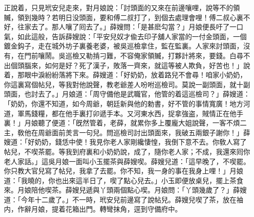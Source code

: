 正說着，只見玳安兒走來，對月娘說：「討頭面的又來在前邊嚷哩，說等不的領贓，領到幾時？若明日没頭面，要和傅二叔打了，到個去處理會哩！傅二叔心裏不好，往家去了。那人嚷了囘去了。」薛嫂問：「是甚麽勾當？」月娘便長吁了一口氣，如此這般，告訴薛嫂說：「平安兒奴才偸去印子舖人家當的一付金頭面，一個鍍金鈎子，走在城外坊子裏養老婆，被吳巡檢拿住，監在監裏。人家來討頭面，沒有，在門前嚷鬧。吳巡檢又勒掯刁難，不容俺家領贓，打夥計將來，要錢。白尋不出個頭腦來，如何是好？死了漢子，敗落一齊來，就這等被人欺負，好苦也！」說着，那眼中淚紛紛落將下來。薛嫂道：「好奶奶，放着路兒不會尋！咱家小奶奶，你這裏寫個帖兒，等我對他說聲，教老爺差人吩咐巡檢司。莫說一副頭面，就十副頭面，也討去了。」月娘道：「周守備他是武職官，他管的着這巡檢司？」薛嫂道：「奶奶，你還不知道，如今周爺，朝廷新與他的勅書，好不管的事情寬廣！地方河道，軍馬錢糧，都在他手裏打卯遞手本。又河東水西，捉拿強盗，賊情正在他手裏！」月娘聽了便道：「旣然管着，老薛，就累你多上覆龐大姐說聲，一客不煩二主，敎他在周爺面前羙言一句兒。問巡檢司討出頭面來，我破五兩銀子謝你！」薛嫂道：「好奶奶，錢恁中使！我見你老人家剛纔悽惶，我倒下意不去。你敎人寫了帖兒，不喫茶罷。等我到府裏和小奶奶說，成了，隨你老人家；不成，我還來囘你老人家話。」這吳月娘一面叫小玉擺茶與薛嫂喫。薛嫂兒道：「這早晚了，不喫罷。你只教大官兒寫了帖兒，我拿了去罷。你不知，我一身的事在我身上哩！」月娘道：「我曉的，你也出來這半日了，喫了點心兒去。」小玉即便放桌兒，擺上茶食來。月娘陪他喫茶。薛嫂兒遞與丫頭兩個點心喫。月娘問：「丫頭幾歲了？」薛嫂道：「今年十二歲了。」不一時，玳安兒前邊寫了說帖兒。薛嫂兒喫了茶，放在袖内，作辭月娘，提着花箱出門。轉彎抹角，逕到守備府中。

